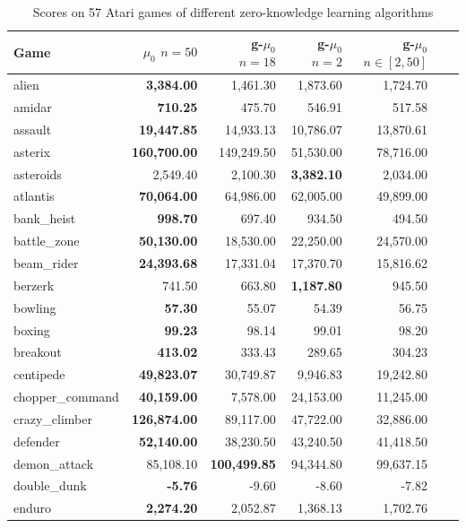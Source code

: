\begin{table}[h!t]
    \centering
    \caption{Scores on 57 Atari games of different zero-knowledge learning algorithms}
    \begin{tabular}{l|rrrrr|r}
    \toprule
        Game  & ${\mu_0}$ $n=50$ & g-${\mu_0}$ $n=18$ & g-${\mu_0}$ $n=2$ & g-$\mu_0$ $n\in[2, 50]$\\ 
    \midrule
        alien  & \textbf{3,384.00} & 1,461.30 & 1,873.60 & 1,724.70 \\ 
        amidar  & \textbf{710.25} & 475.70 & 546.91 & 517.58 \\ 
        assault  & \textbf{19,447.85} & 14,933.13 & 10,786.07 & 13,870.61 \\ 
        asterix & \textbf{160,700.00} & 149,249.50 & 51,530.00 & 78,716.00 \\ 
        asteroids & 2,549.40 & 2,100.30 & \textbf{3,382.10} & 2,034.00 \\ 
        atlantis & \textbf{70,064.00} & 64,986.00 & 62,005.00 & 49,899.00 \\ 
        bank\_heist & \textbf{998.70} & 697.40 & 934.50 & 494.50 \\ 
        battle\_zone & \textbf{50,130.00} & 18,530.00 & 22,250.00 & 24,570.00 \\ 
        beam\_rider & \textbf{24,393.68} & 17,331.04 & 17,370.70 & 15,816.62 \\ 
        berzerk & 741.50 & 663.80 & \textbf{1,187.80} & 945.50 \\ 
        bowling & \textbf{57.30} & 55.07 & 54.39 & 56.75 \\ 
        boxing & \textbf{99.23} & 98.14 & 99.01 & 98.20 \\ 
        breakout & \textbf{413.02} & 333.43 & 289.65 & 304.23 \\ 
        centipede & \textbf{49,823.07} & 30,749.87 & 9,946.83 & 19,242.80 \\ 
        chopper\_command & \textbf{40,159.00} & 7,578.00 & 24,153.00 & 11,245.00 \\ 
        crazy\_climber & \textbf{126,874.00} & 89,117.00 & 47,722.00 & 32,886.00 \\ 
        defender & \textbf{52,140.00} & 38,230.50 & 43,240.50 & 41,418.50 \\ 
        demon\_attack & 85,108.10 & \textbf{100,499.85} & 94,344.80 & 99,637.15 \\ 
        double\_dunk & \textbf{-5.76} & -9.60 & -8.60 & -7.82 \\ 
        enduro & \textbf{2,274.20} & 2,052.87 & 1,368.13 & 1,702.76 \\ 

\end{tabular}
\end{table}
